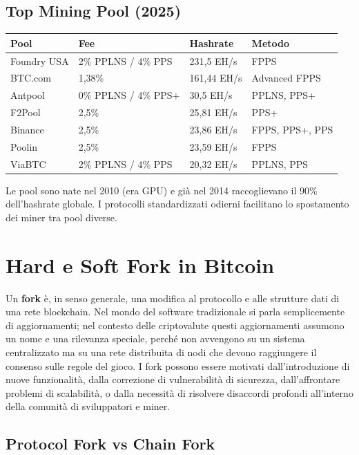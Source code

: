 \documentclass[
  italian,
  openany]{book}
\newcounter{none} %
\begin{document}
\subsection{Top Mining Pool (2025)}\label{top-mining-pool-2025}

{\def\LTcaptype{none} %
\begin{longtable}[]{@{}llll@{}}
\toprule\noalign{}
Pool & Fee & Hashrate & Metodo \\
\midrule\noalign{}
\endhead
\bottomrule\noalign{}
\endlastfoot
Foundry USA & 2\% PPLNS / 4\% PPS & 231,5 EH/s & FPPS \\
BTC.com & 1,38\% & 161,44 EH/s & Advanced FPPS \\
Antpool & 0\% PPLNS / 4\% PPS+ & 30,5 EH/s & PPLNS, PPS+ \\
F2Pool & 2,5\% & 25,81 EH/s & PPS+ \\
Binance & 2,5\% & 23,86 EH/s & FPPS, PPS+, PPS \\
Poolin & 2,5\% & 23,59 EH/s & FPPS \\
ViaBTC & 2\% PPLNS / 4\% PPS & 20,32 EH/s & PPLNS, PPS \\
\end{longtable}
}

Le pool sono nate nel 2010 (era GPU) e già nel 2014 raccoglievano il
90\% dell'hashrate globale. I protocolli standardizzati odierni
facilitano lo spostamento dei miner tra pool diverse.

\section{Hard e Soft Fork in Bitcoin}\label{hard-e-soft-fork-in-bitcoin}

Un \textbf{fork} è, in senso generale, una modifica al protocollo e alle
strutture dati di una rete blockchain. Nel mondo del software
tradizionale si parla semplicemente di aggiornamenti; nel contesto delle
criptovalute questi aggiornamenti assumono un nome e una rilevanza
speciale, perché non avvengono su un sistema centralizzato ma su una
rete distribuita di nodi che devono raggiungere il consenso sulle regole
del gioco. I fork possono essere motivati dall'introduzione di nuove
funzionalità, dalla correzione di vulnerabilità di sicurezza,
dall'affrontare problemi di scalabilità, o dalla necessità di risolvere
disaccordi profondi all'interno della comunità di sviluppatori e miner.

\subsection{Protocol Fork vs Chain
Fork}\label{protocol-fork-vs-chain-fork}
\end{document}
